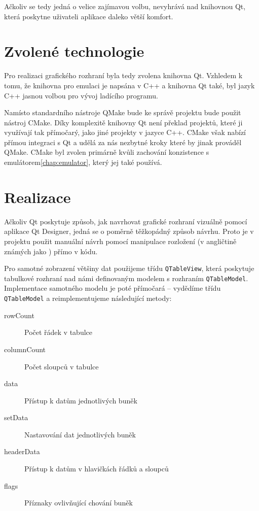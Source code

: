 Ačkoliv se tedy jedná o velice zajímavou volbu, nevyhrává nad knihovnou Qt, která poskytne uživateli aplikace daleko větší komfort.

\section{Zvolené technologie}

Pro realizaci grafického rozhraní byla tedy zvolena knihovna Qt. Vzhledem k tomu, že knihovna pro emulaci je napsána v C++ a knihovna Qt také, byl jazyk C++ jasnou volbou pro vývoj ladícího programu.

Namísto standardního nástroje QMake bude ke správě projektu bude použit nástroj CMake. Díky komplexitě knihovny Qt není překlad projektů, které ji využívají tak přímočarý, jako jiné projekty v jazyce C++. CMake však nabízí přímou integraci s Qt a udělá za nás nezbytné kroky které by jinak prováděl QMake. CMake byl zvolen primárně kvůli zachování konzistence s emulátorem\ref{chap:emulator}, který jej také používá.

\section{Realizace}

Ačkoliv Qt poskytuje způsob, jak navrhovat grafické rozhraní vizuálně pomocí aplikace Qt Designer\cite{qt-designer}, jedná se o poměrně těžkopádný způsob návrhu. Proto je v projektu použit manuální návrh pomocí manipulace rozložení (v angličtině známých jako ) přímo v kódu.

Pro samotné zobrazení většiny dat použijeme třídu \texttt{QTableView}, která poskytuje tabulkové rozhraní nad námi definovaným modelem s rozhraním \texttt{QTableModel}. Implementace samotného modelu je poté přímočará -- vydědíme třídu \texttt{QTableModel} a reimplementujeme následující metody:

\begin{description}
	\item[rowCount] Počet řádek v tabulce
	\item[columnCount] Počet sloupců v tabulce
	\item[data] Přístup k datům jednotlivých buněk
	\item[setData] Nastavování dat jednotlivých buněk
	\item[headerData] Přístup k datům v hlavičkách řádků a sloupců
	\item[flags] Příznaky ovlivňující chování buněk
\end{description}

